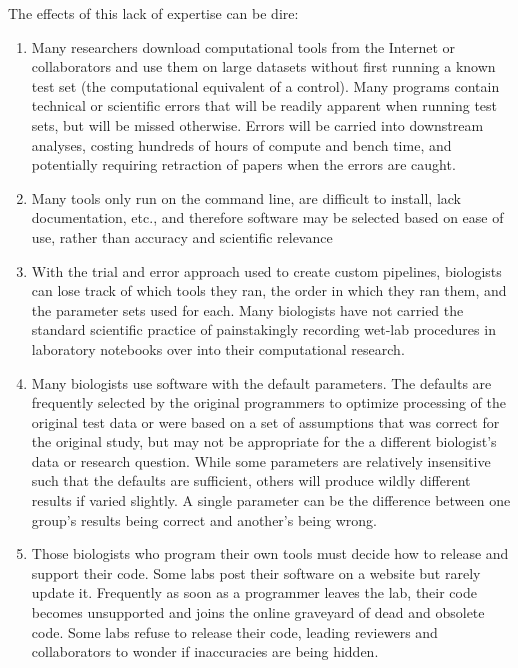 \documentclass[ChapterTOCs,krantz2]{krantz} %
\begin{document}
The effects of this lack of expertise can be dire:  
\begin{enumerate}
\item Many researchers download computational tools from the Internet 
or collaborators 
and use them on large datasets without first
running a known test set
(the computational equivalent of a control).  Many programs contain
technical or scientific errors that will be readily apparent when running 
test sets, but will be missed otherwise\cite{Kelly2008}. Errors will be
carried into downstream analyses, costing
hundreds of hours of compute and bench time, and 
potentially requiring retraction of papers when the errors are caught\cite{Merali2010}.  

\item Many tools only run on the command line, are difficult to install, lack
documentation, etc., and therefore software may be selected based on ease
of use, rather than accuracy and scientific relevance

\item With the trial and error
approach used to create custom pipelines, biologists can
lose track of which tools they ran, the order in which they ran them, and the
parameter sets used for each.  Many biologists have not carried 
the standard scientific practice of painstakingly recording
wet-lab procedures in laboratory notebooks
over into their computational research.

\item Many biologists use software with the default parameters.  
The defaults are frequently selected by the original
programmers to optimize processing of the original test data or were based on a
set of assumptions that was correct for the original study, but may not be appropriate
for the a different biologist's data or research question.  While some parameters 
are relatively insensitive such that the defaults are sufficient, others 
will produce wildly different results if varied slightly.  
A single parameter
can be the difference between one group's results being correct and another's
being wrong.  

\item Those biologists who program their own tools must decide how
to release and support their code.
Some labs post their software on a website but rarely update it.  
Frequently as soon as a programmer
leaves the lab, their code becomes unsupported and 
joins the online graveyard of dead and obsolete code.  
Some labs refuse to release their code\cite{Morin2012}, 
leading reviewers and collaborators to wonder if 
inaccuracies are being hidden.  
\end{enumerate}
\end{document}
